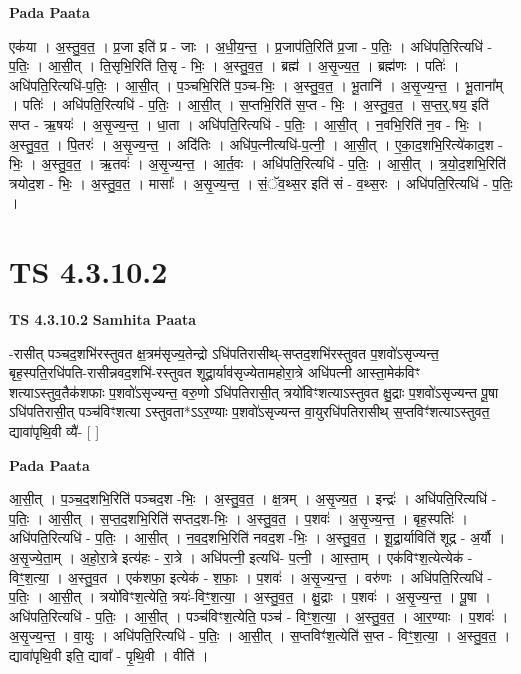 \documentclass[17pt]{extarticle}
\begin{document}
\textbf{Pada Paata} \newline

एक॑या । अ॒स्तु॒व॒त॒ । प्र॒जा इति॑ प्र - जाः । अ॒धी॒य॒न्त॒ । प्र॒जाप॑ति॒रिति॑ प्र॒जा - प॒तिः॒ । अधि॑पति॒रित्यधि॑ - प॒तिः॒ । आ॒सी॒त् । ति॒सृभि॒रिति॑ ति॒सृ - भिः॒ । अ॒स्तु॒व॒त॒ । ब्रह्म॑ । अ॒सृ॒ज्य॒त॒ । ब्रह्म॑णः । पतिः॑ । अधि॑पति॒रित्यधि॑-प॒तिः॒ । आ॒सी॒त् । प॒ञ्चभि॒रिति॑ प॒ञ्च-भिः॒ । अ॒स्तु॒व॒त॒ । भू॒तानि॑ । अ॒सृ॒ज्य॒न्त॒ । भू॒ताना᳚म् । पतिः॑ । अधि॑पति॒रित्यधि॑ - प॒तिः॒ । आ॒सी॒त् । स॒प्तभि॒रिति॑ स॒प्त - भिः॒ । अ॒स्तु॒व॒त॒ । स॒प्त॒र्॒.षय॒ इति॑ सप्त - ऋ॒षयः॑ । अ॒सृ॒ज्य॒न्त॒ । धा॒ता । अधि॑पति॒रित्यधि॑ - प॒तिः॒ । आ॒सी॒त् । न॒वभि॒रिति॑ न॒व - भिः॒ । अ॒स्तु॒व॒त॒ । पि॒तरः॑ । अ॒सृ॒ज्य॒न्त॒ । अदि॑तिः । अधि॑प॒त्नीत्यधि॑-प॒त्नी॒ । आ॒सी॒त् । ए॒का॒द॒शभि॒रित्ये॑काद॒श - भिः॒ । अ॒स्तु॒व॒त॒ । ऋ॒तवः॑ । अ॒सृ॒ज्य॒न्त॒ । आ॒र्त॒वः । अधि॑पति॒रित्यधि॑ - प॒तिः॒ । आ॒सी॒त् । त्र॒यो॒द॒शभि॒रिति॑ त्रयोद॒श - भिः॒ । अ॒स्तु॒व॒त॒ । मासाः᳚ । अ॒सृ॒ज्य॒न्त॒ । सं॒ॅव॒थ्स॒र इति॑ सं - व॒थ्स॒रः । अधि॑पति॒रित्यधि॑ - प॒तिः॒ ।  \newline





\section{ TS 4.3.10.2 }

\textbf{TS 4.3.10.2 } \newline
\textbf{Samhita Paata} \newline

-रासीत् पञ्चद॒शभि॑रस्तुवत क्ष॒त्रम॑सृज्य॒तेन्द्रो ऽधि॑पतिरासीथ्-सप्तद॒शभि॑रस्तुवत प॒शवो॑ऽसृज्यन्त॒ बृह॒स्पति॒रधि॑पति-रासीन्नवद॒शभि॑-रस्तुवत शूद्रा॒र्याव॑सृज्येतामहोरा॒त्रे अधि॑पत्नी आस्ता॒मेक॑विꣳ शत्याऽस्तुव॒तैक॑शफाः प॒शवो॑ऽसृज्यन्त॒ वरु॒णो ऽधि॑पतिरासी॒त् त्रयो॑विꣳशत्याऽस्तुवत क्षु॒द्राः प॒शवो॑ऽसृज्यन्त पू॒षा ऽधि॑पतिरासी॒त् पञ्च॑विꣳशत्या ऽस्तुवता*ऽऽर॒ण्याः प॒शवो॑ऽसृज्यन्त वा॒युरधि॑पतिरासीथ् स॒प्तविꣳ॑शत्याऽस्तुवत॒ द्यावा॑पृथि॒वी व्यै॑- [  ] \newline

\textbf{Pada Paata} \newline

आ॒सी॒त् । प॒ञ्च॒द॒शभि॒रिति॑ पञ्चद॒श -भिः॒ । अ॒स्तु॒व॒त॒ । क्ष॒त्रम् । अ॒सृ॒ज्य॒त॒ । इन्द्रः॑ । अधि॑पति॒रित्यधि॑ - प॒तिः॒ । आ॒सी॒त् । स॒प्त॒द॒शभि॒रिति॑ सप्तद॒श-भिः॒ । अ॒स्तु॒व॒त॒ । प॒शवः॑ । अ॒सृ॒ज्य॒न्त॒ । बृह॒स्पतिः॑ । अधि॑पति॒रित्यधि॑ - प॒तिः॒ । आ॒सी॒त् । न॒व॒द॒शभि॒रिति॑ नवद॒श -भिः॒ । अ॒स्तु॒व॒त॒ । शू॒द्रा॒र्याविति॑ शूद्र - अ॒र्यौ । अ॒सृ॒ज्ये॒ता॒म् । अ॒हो॒रा॒त्रे इत्य॑हः - रा॒त्रे । अधि॑पत्नी॒ इत्यधि॑- प॒त्नी॒ । आ॒स्ता॒म् । एक॑विꣳश॒त्येत्येक॑ - विꣳ॒॒श॒त्या॒ । अ॒स्तु॒व॒त । एक॑शफा॒ इत्येक॑ - श॒फाः॒ । प॒शवः॑ । अ॒सृ॒ज्य॒न्त॒ । वरु॑णः । अधि॑पति॒रित्यधि॑ - प॒तिः॒ । आ॒सी॒त् । त्रयो॑विꣳश॒त्येति॒ त्रयः॑-विꣳ॒॒श॒त्या॒ । अ॒स्तु॒व॒त॒ । क्षु॒द्राः । प॒शवः॑ । अ॒सृ॒ज्य॒न्त॒ । पू॒षा । अधि॑पति॒रित्यधि॑ - प॒तिः॒ । आ॒सी॒त् । पञ्च॑विꣳश॒त्येति॒ पञ्च॑ - विꣳ॒॒श॒त्या॒ । अ॒स्तु॒व॒त॒ । आ॒र॒ण्याः । प॒शवः॑ । अ॒सृ॒ज्य॒न्त॒ । वा॒युः । अधि॑पति॒रित्यधि॑ - प॒तिः॒ । आ॒सी॒त् । स॒प्तविꣳ॑श॒त्येति॑ स॒प्त - विꣳ॒॒श॒त्या॒ । अ॒स्तु॒व॒त॒ । द्यावा॑पृथि॒वी इति॒ द्यावा᳚ - पृ॒थि॒वी । वीति॑ ।  \newline
\end{document}
